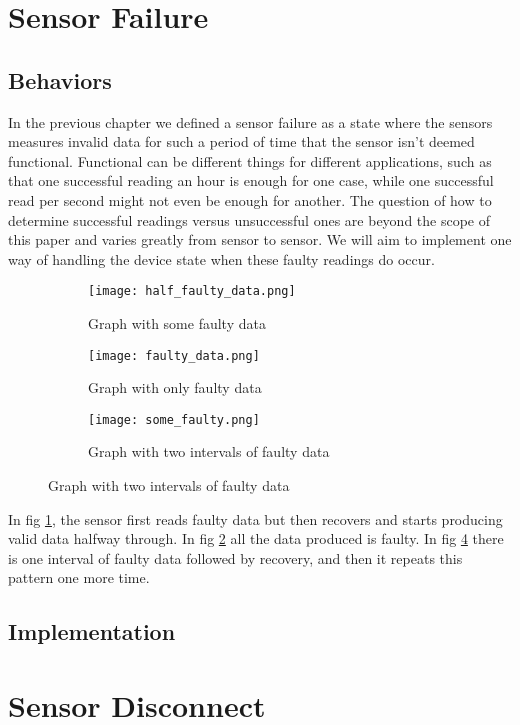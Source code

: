 \section{Sensor Failure}

\subsection{Behaviors}
In the previous chapter we defined a sensor failure as a state where the sensors measures invalid data for such a period of time that the sensor isn't deemed functional. Functional can be different things for different applications, such as that one successful reading an hour is enough for one case, while one successful read per second might not even be enough for another. The question of how to determine successful readings versus unsuccessful ones are beyond the scope of this paper and varies greatly from sensor to sensor. We will aim to implement one way of handling the device state when these faulty readings do occur.

\begin{figure}[H]
\centering
	\begin{subfigure}[b]{0.3\textwidth}
    \texttt{[image: half\_faulty\_data.png]}
    \caption{Graph with some faulty data}
    \label{fig:half_faulty}
	\end{subfigure}
	\begin{subfigure}[b]{0.3\textwidth}
    \texttt{[image: faulty\_data.png]}
    \caption{Graph with only faulty data}
    \label{fig:faulty}
	\end{subfigure}
	\begin{subfigure}[b]{0.3\textwidth}
    \texttt{[image: some\_faulty.png]}
    \caption{Graph with two intervals of faulty data}
    \label{fig:some_faulty}
	\end{subfigure}
\end{figure}

In fig \ref{fig:half_faulty}, the sensor first reads faulty data but then recovers  and starts producing valid data halfway through. In fig \ref{fig:faulty} all the data produced is faulty. In fig \ref{fig:some_faulty} there is one interval of faulty data followed by recovery, and then it repeats this pattern one more time.

\subsection{Implementation}

\section{Sensor Disconnect}